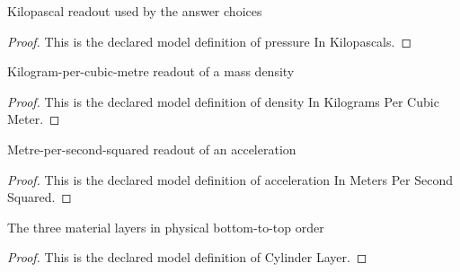 \begin{definition}
  \label{def:physics:phyx-mini-0663:phyxminiproblems-problemphyxmini0663-pressureinkilopascals}
  Kilopascal readout used by the answer choices
\end{definition}
\begin{proof}
  This is the declared model definition of pressure In Kilopascals.
\end{proof}
\begin{definition}
  \label{def:physics:phyx-mini-0663:phyxminiproblems-problemphyxmini0663-densityinkilogramspercubicmeter}
  Kilogram-per-cubic-metre readout of a mass density
\end{definition}
\begin{proof}
  This is the declared model definition of density In Kilograms Per Cubic Meter.
\end{proof}
\begin{definition}
  \label{def:physics:phyx-mini-0663:phyxminiproblems-problemphyxmini0663-accelerationinmeterspersecondsquared}
  Metre-per-second-squared readout of an acceleration
\end{definition}
\begin{proof}
  This is the declared model definition of acceleration In Meters Per Second Squared.
\end{proof}
\begin{definition}
  \label{def:physics:phyx-mini-0663:phyxminiproblems-problemphyxmini0663-cylinderlayer}
  The three material layers in physical bottom-to-top order
\end{definition}
\begin{proof}
  This is the declared model definition of Cylinder Layer.
\end{proof}
